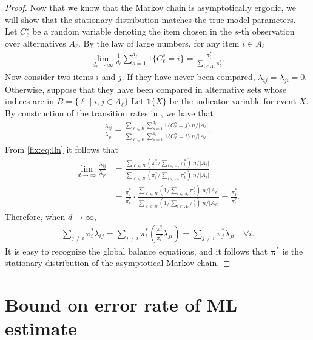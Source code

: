 \begin{proof}
Now that we know that the Markov chain is asymptotically ergodic, we will show that the stationary distribution matches the true model parameters.
Let $C_\ell^s$ be a random variable denoting the item chosen in the $s$-th observation over alternatives $A_\ell$.
By the law of large numbers, for any item $i \in A_\ell$
\begin{align}
\label{fix:eq:lln}
\lim_{d_\ell \to \infty} \frac{1}{d_\ell} \sum_{s = 1}^{d_\ell} 1\{C_\ell^s = i\} = \frac{\pi^*_i}{\sum_{t \in A_\ell} \pi^*_t}.
\end{align}
Now consider two items $i$ and $j$.
If they have never been compared, $\lambda_{ij} = \lambda_{ji} = 0$.
Otherwise, suppose that they have been compared in alternative sets whose indices are in $B = \{ \ell \mid i, j \in A_\ell \}$
Let $\mathbf{1}\{X\}$ be the indicator variable for event $X$.
By construction of the transition rates in \LSR{}, we have that
\begin{align}
\label{fix:eq:ratio}
\frac{\lambda_{ij}}{\lambda_{ji}}
= \frac{\sum_{\ell \in B} \sum_{s = 1}^{d_\ell} \mathbf{1}\{C_\ell^s = j\} \ n / |A_\ell|}
       {\sum_{\ell \in B} \sum_{s = 1}^{d_\ell} \mathbf{1}\{C_\ell^s = i\} \ n / |A_\ell|}.
\end{align}
From \eqref{fix:eq:lln} it follows that
\begin{align}
\lim_{d \to \infty}\frac{\lambda_{ij}}{\lambda_{ji}}
& = \frac{\sum_{\ell \in B} (\pi^*_j / \sum_{t \in A_\ell} \pi^*_t) \ n / |A_\ell|}
         {\sum_{\ell \in B} (\pi^*_i / \sum_{t \in A_\ell} \pi^*_t) \ n / |A_\ell|} \\
& = \frac{\pi^*_j }{\pi^*_i}
    \cdot \frac{\sum_{\ell \in B}(1 / \sum_{t \in A_\ell} \pi^*_t) \ n / |A_\ell|}
               {\sum_{\ell \in B}(1 / \sum_{t \in A_\ell} \pi^*_t) \ n / |A_\ell|}
  = \frac{\pi^*_j}{\pi^*_i}.
\end{align}
Therefore, when $d \to \infty$,
\begin{align}
\sum_{j \ne i} \pi^*_i \lambda_{ij} = \sum_{j \ne i} \pi^*_i \left( \frac{\pi^*_j}{\pi^*_i} \lambda_{ji} \right)
                                    = \sum_{j \ne i} \pi^*_j \lambda_{ji}  \quad \forall i.
\end{align}
It is easy to recognize the global balance equations, and it follows that $\bm{\pi}^*$ is the stationary distribution of the asymptotical Markov chain.
\end{proof}


\section{Bound on error rate of ML estimate}


